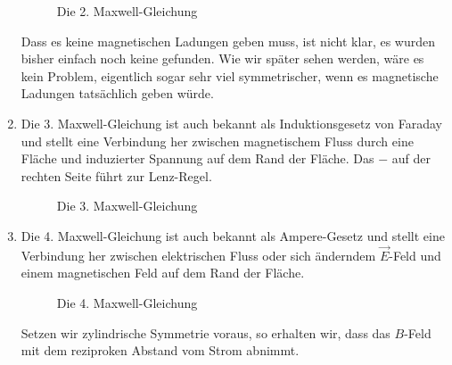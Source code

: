 \documentclass{../../theo-lecture/lecture}
\begin{document}
\begin{enumerate}[(1)]
\begin{figure}[ht]
            \caption{Die 2. Maxwell-Gleichung}
        \end{figure}
        Dass es keine magnetischen Ladungen geben muss, ist nicht klar, es wurden bisher einfach noch keine gefunden. Wie wir später sehen werden, wäre es kein Problem, eigentlich sogar sehr viel symmetrischer, wenn es magnetische Ladungen tatsächlich geben würde.
        \item Die 3. Maxwell-Gleichung ist auch bekannt als Induktionsgesetz von Faraday und stellt eine Verbindung her zwischen magnetischem Fluss durch eine Fläche und induzierter Spannung auf dem Rand der Fläche. Das $-$ auf der rechten Seite führt zur Lenz-Regel.
        \begin{figure}[ht]
            \centering
            \caption{Die 3. Maxwell-Gleichung}
        \end{figure}
        \item Die 4. Maxwell-Gleichung ist auch bekannt als Ampere-Gesetz und stellt eine Verbindung her zwischen elektrischen Fluss oder sich änderndem $\vec E$-Feld und einem magnetischen Feld auf dem Rand der Fläche. 
        \begin{figure}[ht]
            \centering
            \caption{Die 4. Maxwell-Gleichung}
        \end{figure}
        Setzen wir zylindrische Symmetrie voraus, so erhalten wir, dass das $B$-Feld mit dem reziproken Abstand vom Strom abnimmt.
    \end{enumerate}
\end{document}
